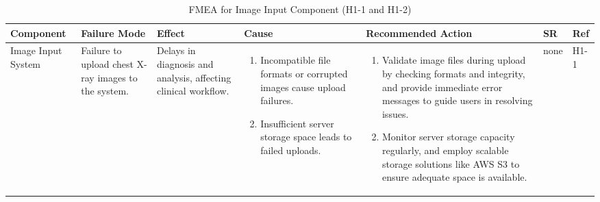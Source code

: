 \documentclass{article}
\begin{document}
\begin{landscape}
    \begin{table}[ht]
    \centering
    \caption{FMEA for Image Input Component (H1-1 and H1-2)}
    \renewcommand{\arraystretch}{1.1}
    {
    \setlength{\tabcolsep}{2pt}
    \begin{tabular}{|p{2.5cm}|p{2.5cm}|p{3cm}|p{5cm}|p{6cm}|p{1cm}|p{1cm}|}
    \hline
    \textbf{Component} & \textbf{Failure Mode} & \textbf{Effect} & \textbf{Cause} & \textbf{Recommended Action} & \textbf{SR} & \textbf{Ref} \\
    \hline

    Image Input System
     & Failure to upload chest X-ray images to the system.
     & Delays in diagnosis and analysis, affecting clinical workflow.
     &
     \begin{enumerate}[leftmargin=*, label={\alph*.}, itemsep=1pt]
         \item Incompatible file formats or corrupted images cause upload failures.
         \item Insufficient server storage space leads to failed uploads.
     \end{enumerate}
     &
     \begin{enumerate}[leftmargin=*, label={\alph*.}, itemsep=1pt]
         \item Validate image files during upload by checking formats and integrity, and provide immediate error messages to guide users in resolving issues.
         \item Monitor server storage capacity regularly, and employ scalable storage solutions like AWS S3 to ensure adequate space is available.
     \end{enumerate}
     & none & H1-1 \\ \hline


\end{tabular}}
\end{table}
\end{landscape}
\end{document}
